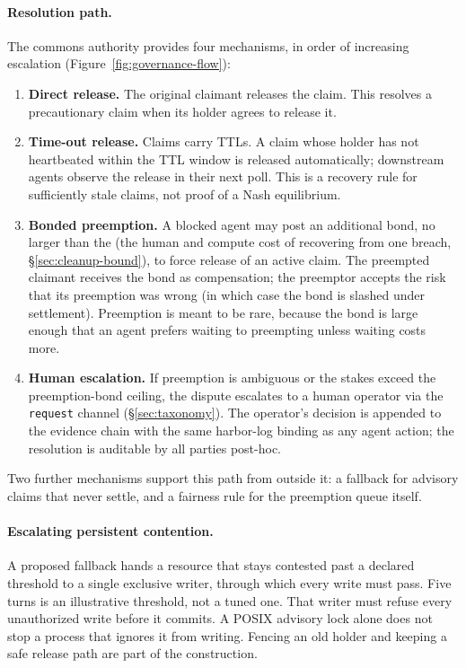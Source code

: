 \documentclass[11pt,a4paper]{article}
\theoremstyle{definition}
\theoremstyle{remark}
\begin{document}
\paragraph{Resolution path.} The commons authority provides four mechanisms, in order of increasing escalation (Figure~\ref{fig:governance-flow}):
\begin{enumerate}[nosep]
  \item \textbf{Direct release.} The original claimant releases the claim. This resolves a precautionary claim when its holder agrees to release it.
  \item \textbf{Time-out release.} Claims carry TTLs. A claim whose holder has not heartbeated within the TTL window is released automatically; downstream agents observe the release in their next poll. This is a recovery rule for sufficiently stale claims, not proof of a Nash equilibrium.
  \item \textbf{Bonded preemption.} A blocked agent may post an additional bond, no larger than the  (the human and compute cost of recovering from one breach, \S\ref{sec:cleanup-bound}), to force release of an active claim. The preempted claimant receives the bond as compensation; the preemptor accepts the risk that its preemption was wrong (in which case the bond is slashed under settlement). Preemption is meant to be rare, because the bond is large enough that an agent prefers waiting to preempting unless waiting costs more.
  \item \textbf{Human escalation.} If preemption is ambiguous or the stakes exceed the preemption-bond ceiling, the dispute escalates to a human operator via the \texttt{request} channel (\S\ref{sec:taxonomy}). The operator's decision is appended to the evidence chain with the same harbor-log binding as any agent action; the resolution is auditable by all parties post-hoc.
\end{enumerate}



Two further mechanisms support this path from outside it: a fallback for advisory claims that never settle, and a fairness rule for the preemption queue itself.

\paragraph{Escalating persistent contention.}
A proposed fallback hands a resource that stays contested past a declared
threshold to a single exclusive writer, through which every write must pass.
Five turns is an illustrative threshold, not a tuned one. That writer must
refuse every unauthorized write before it commits. A POSIX advisory lock
alone does not stop a process that ignores it from writing. Fencing an old
holder and keeping a safe release path are part of the construction.
\end{document}
